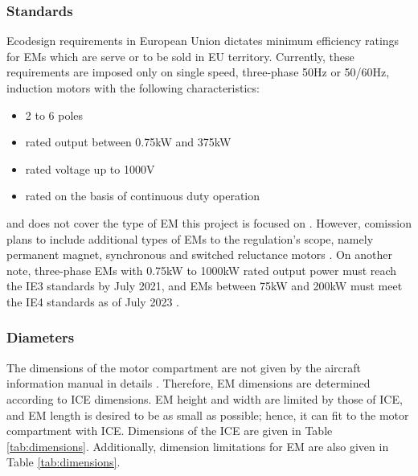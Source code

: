 \documentclass[11pt, a4paper]{article}
\begin{document}
	\subsubsection{Standards}
	Ecodesign requirements in European Union dictates minimum efficiency ratings for EMs which are serve or to be sold in EU territory. Currently, these requirements are imposed only on single speed, three-phase 50Hz or 50/60Hz, induction motors with the following characteristics:
	\begin{itemize}
		\item 2 to 6 poles
		\item rated output between 0.75kW and 375kW
		\item rated voltage up to 1000V
		\item rated on the basis of continuous duty operation
	\end{itemize}
and does not cover the type of EM this project is focused on \cite{ec-640-2009}. However, comission plans to include additional types of EMs to the regulation's scope, namely permanent magnet, synchronous and switched reluctance motors \cite{eu-2019-1781}. On another note, three-phase EMs with 0.75kW to 1000kW rated output power must reach the IE3 standards by July 2021, and EMs between 75kW and 200kW must meet the IE4 standards as of July 2023 \cite{eu-2019-1781}.
	\subsubsection{Diameters}
	The dimensions of the motor compartment are not given by the aircraft information manual in details \cite{172SIM}. Therefore, EM dimensions are determined according to ICE dimensions. EM height and width are limited by those of ICE, and EM length is desired to be as small as possible; hence, it can fit to the motor compartment with ICE. Dimensions of the ICE are given in Table \ref{tab:dimensions}. Additionally, dimension limitations for EM are also given in Table \ref{tab:dimensions}.
	
\end{document}
